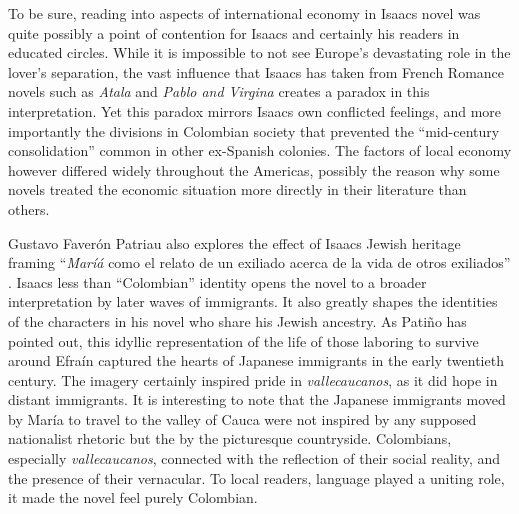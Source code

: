 \documentclass[12pt]{report}\usepackage[]{graphicx}\usepackage[]{color}
\begin{document}
\begin{spacing}{1.9}
To be sure, reading into aspects of international economy in Isaacs novel was quite possibly a point of contention for Isaacs and certainly his readers in educated circles.
While it is impossible to not see Europe's devastating role in the lover's separation, the vast influence that Isaacs has taken from French Romance novels such as \textit{Atala} and \textit{Pablo and Virgina} creates a paradox in this interpretation.
Yet this paradox mirrors  Isaacs own conflicted feelings, and more importantly the divisions in Colombian society that prevented the \enquote{mid-century consolidation} common in other ex-Spanish colonies.
The factors of local economy however differed widely throughout the Americas, possibly the reason why some novels treated the economic situation more directly in their literature than others.

Gustavo Faverón Patriau also explores the effect of Isaacs Jewish heritage framing \enquote{\textit{Maríá} como el relato de un exiliado acerca de la vida de otros exiliados} \autocite[341]{Patriau2004}.
Isaacs less than \enquote{Colombian} identity opens the novel to a broader interpretation by later waves of immigrants.
It also greatly shapes the identities of the characters in his novel who share his Jewish ancestry.
As Patiño has pointed out, this idyllic representation of the life of those laboring to survive around Efraín captured the hearts of Japanese immigrants in the early twentieth century. 
The imagery certainly inspired pride in \textit{vallecaucanos}, as it did hope in distant immigrants. 
It is interesting to note that the Japanese immigrants moved by María to travel to the valley of Cauca were not inspired by any supposed nationalist rhetoric but the by the picturesque countryside.
Colombians, especially \textit{vallecaucanos}, connected with the reflection of their social reality, and the presence of their vernacular. 
To local readers, language played a uniting role, it made the novel feel purely Colombian. 



\end{spacing}
\end{document}
